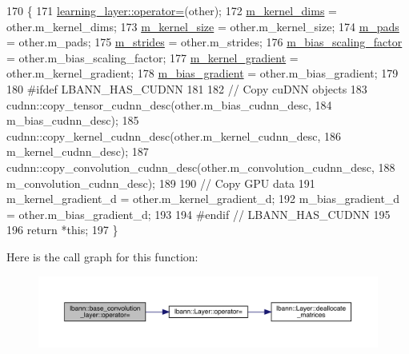 \begin{DoxyCode}
170                                                                          \{
171     \hyperlink{classlbann_1_1Layer_a00d8acde68fda2f38c4a39ef8c89234a}{learning\_layer::operator=}(other);
172     \hyperlink{classlbann_1_1base__convolution__layer_a283edb6a476f975e713d0b4235ac658f}{m\_kernel\_dims} = other.m\_kernel\_dims;
173     \hyperlink{classlbann_1_1base__convolution__layer_aa9da3e44499643a86bd611b5eb500dd4}{m\_kernel\_size} = other.m\_kernel\_size;
174     \hyperlink{classlbann_1_1base__convolution__layer_a9732a8a0170a413bf0cde0128ad2a571}{m\_pads} = other.m\_pads;
175     \hyperlink{classlbann_1_1base__convolution__layer_a2429495822363e41f1f6b96a6b430445}{m\_strides} = other.m\_strides;
176     \hyperlink{classlbann_1_1base__convolution__layer_a5abe0bcd128b66a41fa481b28a9c2104}{m\_bias\_scaling\_factor} = other.m\_bias\_scaling\_factor;
177     \hyperlink{classlbann_1_1base__convolution__layer_a4129f11df61ed92bcad24ae855d7bd11}{m\_kernel\_gradient} = other.m\_kernel\_gradient;
178     \hyperlink{classlbann_1_1base__convolution__layer_a2ee1db4a1a74f167e3472d5ed7075179}{m\_bias\_gradient} = other.m\_bias\_gradient;
179 
180 \textcolor{preprocessor}{  #ifdef LBANN\_HAS\_CUDNN}
181 
182     \textcolor{comment}{// Copy cuDNN objects}
183     cudnn::copy\_tensor\_cudnn\_desc(other.m\_bias\_cudnn\_desc,
184                                   m\_bias\_cudnn\_desc);
185     cudnn::copy\_kernel\_cudnn\_desc(other.m\_kernel\_cudnn\_desc,
186                                   m\_kernel\_cudnn\_desc);
187     cudnn::copy\_convolution\_cudnn\_desc(other.m\_convolution\_cudnn\_desc,
188                                        m\_convolution\_cudnn\_desc);
189 
190     \textcolor{comment}{// Copy GPU data}
191     m\_kernel\_gradient\_d = other.m\_kernel\_gradient\_d;
192     m\_bias\_gradient\_d = other.m\_bias\_gradient\_d;
193 
194 \textcolor{preprocessor}{  #endif // LBANN\_HAS\_CUDNN}
195 
196     \textcolor{keywordflow}{return} *\textcolor{keyword}{this};
197   \}
\end{DoxyCode}
Here is the call graph for this function\+:\nopagebreak
\begin{figure}[H]
\begin{center}
\leavevmode
\includegraphics[width=350pt]{classlbann_1_1base__convolution__layer_ad31a2eac6843bd8643538530f1017c32_cgraph}
\end{center}
\end{figure}
\mbox{\label{classlbann_1_1base__convolution__layer_a9f850c1bdf4ae3cd986411d3cb3a524c}} 
